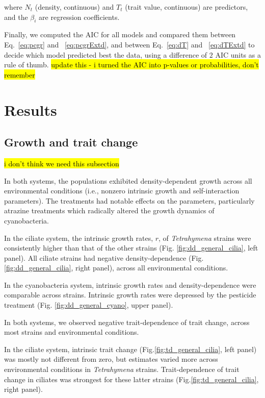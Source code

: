 \documentclass{getwriting}
\begin{document}
where $N_t$ (density, continuous) and $T_t$ (trait value, continuous) are predictors, and the $\beta_i$ are regression coefficients. 

Finally, we computed the AIC for all models and compared them between Eq.~\ref{eq:pcgr} and ~\ref{eq:pcgrExtd}, and between Eq.~\ref{eq:dT} and ~\ref{eq:dTExtd} to decide which model predicted best the data, using a difference of $2$ AIC units as a rule of thumb. \hl{update this - i turned the AIC into p-values or probabilities, don't remember}

\section{Results}

\subsection{Growth and trait change}

\hl{i don't think we need this subsection}

In both systems, the populations exhibited density-dependent growth across all environmental conditions (i.e., nonzero intrinsic growth and self-interaction parameters). The treatments had notable effects on the parameters, particularly atrazine treatments which radically altered the growth dynamics of cyanobacteria.

In the ciliate system, the intrinsic growth rates, $r$, of \emph{Tetrahymena} strains were consistently higher than that of the other strains (Fig. \ref{fig:dd_general_cilia}, left panel). All ciliate strains had negative density-dependence (Fig. \ref{fig:dd_general_cilia}, right panel), across all environmental conditions. 

In the cyanobacteria system, intrinsic growth rates and density-dependence were comparable across strains. Intrinsic growth rates were depressed by the pesticide treatment (Fig. \ref{fig:dd_general_cyano}, upper panel). 

In both systems, we observed negative trait-dependence of trait change, across most strains and environmental conditions. 

In the ciliate system, intrinsic trait change (Fig.\ref{fig:td_general_cilia}, left panel) was mostly not different from zero, but estimates varied more across environmental conditions in \emph{Tetrahymena} strains. Trait-dependence of trait change in ciliates was strongest for these latter strains (Fig.\ref{fig:td_general_cilia}, right panel). 
\end{document}
